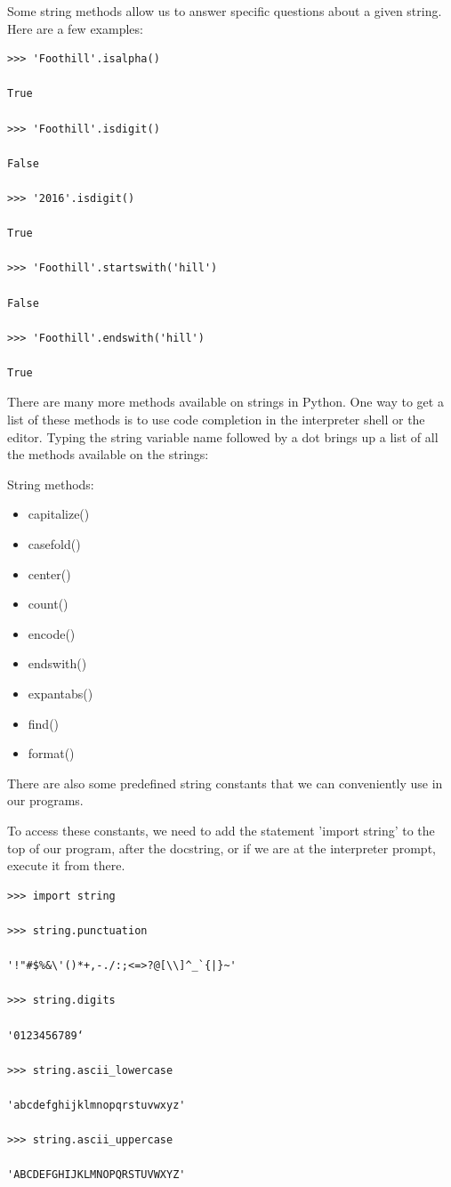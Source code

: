 \documentclass{article}
\begin{document}
Some string methods allow us to answer specific questions about a given string.  Here are a few examples:

\begin{lstlisting}
>>> 'Foothill'.isalpha()

True

>>> 'Foothill'.isdigit()

False

>>> '2016'.isdigit()

True

>>> 'Foothill'.startswith('hill')

False

>>> 'Foothill'.endswith('hill')

True
\end{lstlisting}

There are many more methods available on strings in Python.  One way to get a list of these methods is to use code completion in the interpreter shell or the editor.  Typing the string variable name followed by a dot brings up a list of all the methods available on the strings:

String methods: 
\begin{itemize}
\item capitalize() 
\item casefold() 
\item center() 
\item count() 
\item encode() 
\item endswith() 
\item expantabs() 
\item find() 
\item format()
\end{itemize}

There are also some predefined string constants that we can conveniently use in our programs.

To access these constants, we need to add the statement 'import string' to the top of our program, after the docstring,  or if we are at the interpreter prompt, execute it from there.

\begin{lstlisting}
>>> import string  

>>> string.punctuation

'!"#$%&\'()*+,-./:;<=>?@[\\]^_`{|}~' 

>>> string.digits

'0123456789‘

>>> string.ascii_lowercase

'abcdefghijklmnopqrstuvwxyz'

>>> string.ascii_uppercase

'ABCDEFGHIJKLMNOPQRSTUVWXYZ'
\end{lstlisting}
\end{document}
